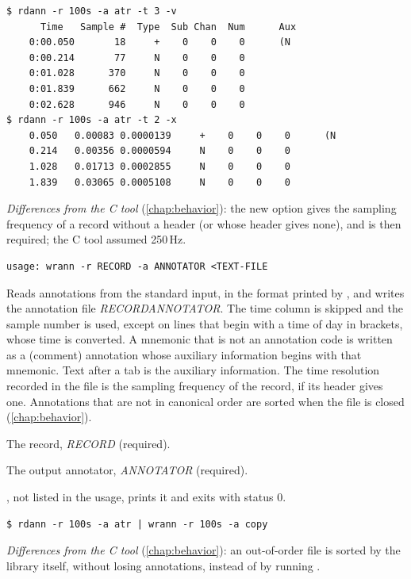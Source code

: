 \begin{lstlisting}[style=text]
$ rdann -r 100s -a atr -t 3 -v
      Time   Sample #  Type  Sub Chan  Num      Aux
    0:00.050       18     +    0    0    0      (N
    0:00.214       77     N    0    0    0
    0:01.028      370     N    0    0    0
    0:01.839      662     N    0    0    0
    0:02.628      946     N    0    0    0
$ rdann -r 100s -a atr -t 2 -x
    0.050   0.00083 0.0000139     +    0    0    0      (N
    0.214   0.00356 0.0000594     N    0    0    0
    1.028   0.01713 0.0002855     N    0    0    0
    1.839   0.03065 0.0005108     N    0    0    0
\end{lstlisting}
\textit{Differences from the C tool} (\cref{chap:behavior}): the new option  gives
the sampling frequency of a record without a header (or whose header gives none), and is
then required; the C tool assumed 250\,Hz.

\begin{lstlisting}[style=signature,language={}]
usage: wrann -r RECORD -a ANNOTATOR <TEXT-FILE
\end{lstlisting}
Reads annotations from the standard input, in the format printed by , and writes
the annotation file \textit{RECORD}\textit{ANNOTATOR}. The time column is skipped and
the sample number is used, except on lines that begin with a time of day in brackets, whose
time is converted. A mnemonic that is not an annotation code is written as a 
(comment) annotation whose auxiliary information begins with that mnemonic. Text after a
tab is the auxiliary information. The time resolution recorded in the file is the sampling
frequency of the record, if its header gives one. Annotations that are not in canonical
order are sorted when the file is closed (\cref{chap:behavior}).
\begin{params}
\item[-r] The record, \textit{RECORD} (required).
\item[-a] The output annotator, \textit{ANNOTATOR} (required).
\end{params}
, not listed in the usage, prints it and exits with status 0.
\begin{lstlisting}[style=text]
$ rdann -r 100s -a atr | wrann -r 100s -a copy
\end{lstlisting}
\textit{Differences from the C tool} (\cref{chap:behavior}): an out-of-order file is sorted
by the library itself, without losing annotations, instead of by running .

